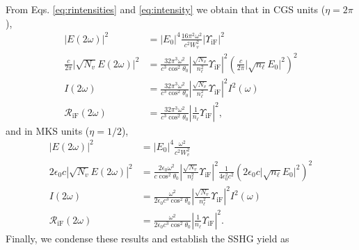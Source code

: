 \documentclass[aps,pra,10pt,amsmath,notitlepage,letterpaper]{revtex4-1}
\begin{document}
From Eqs. \eqref{eq:rintensities} and \eqref{eq:intensity} we obtain that in
CGS units ($\eta=2\pi$), 
\begin{equation}\label{eq:r01}
\begin{split}
\vert E(2\omega)\vert^{2} &=
\vert E_{0}\vert^{4}\frac{16\pi^{2}\omega^{2}}{c^{2}W^2_{v}}
\vert\Upsilon_{\mathrm{iF}}\vert^{2}\\
\frac{c}{2\pi}\vert\sqrt{N_{v}}E(2\omega)\vert^{2} &=
\frac{32\pi^{3}\omega^{2}}{c^{3}\cos^2\theta_{0}}
\left\vert\frac{\sqrt{N_{v}}}{n^{2}_{\ell}}\Upsilon_{\mathrm{iF}}\right\vert^{2} 
\left(\frac{c}{2\pi}\vert\sqrt{n_{\ell}}E_{0}\vert^{2}\right)^{2}\\ 
I(2\omega) &=
\frac{32\pi^{3}\omega^{2}}{c^{3}\cos^2\theta_{0}}
\left\vert\frac{\sqrt{N_{v}}}{n^{2}_{\ell}}\Upsilon_{\mathrm{iF}}\right\vert^{2}
I^{2}(\omega)\\
\mathcal{R}_{\mathrm{iF}}(2\omega) &=
\frac{32\pi^{3}\omega^{2}}{c^{3}\cos^2\theta_{0}}
\left\vert\frac{1}{n_{\ell}}\Upsilon_{\mathrm{iF}}\right\vert^{2},
\end{split} 
\end{equation} 
and in MKS units ($\eta=1/2$),
\begin{equation}\label{r01m}
\begin{split}
\vert E(2\omega)\vert^{2} &=
\vert E_{0}\vert^{4}\frac{\omega^{2}}{c^{2}W^{2}_{v}}\\
2\epsilon_{0}c|\sqrt{N_{v}}E(2\omega)|^{2} &=
\frac{2\epsilon_{0}\omega^{2}}{c\cos^{2}\theta_{0}}
\left\vert\frac{\sqrt{N_{v}}}{n^{2}_{\ell}}\Upsilon_{\mathrm{iF}}\right\vert^{2} 
\frac{1}{4\epsilon^{2}_0c^{2}}
\left(2\epsilon_{0}c\vert\sqrt{n_{\ell}}E_{0}\vert^{2}\right)^{2}\\
I(2\omega) &= 
\frac{\omega^{2}}{2\epsilon_{0}c^3\cos^{2}\theta_{0}}
\left\vert\frac{\sqrt{N_{v}}}{n^{2}_{\ell}}\Upsilon_{\mathrm{iF}}\right\vert^{2}
I^{2}(\omega)\\
\mathcal{R}_{\mathrm{iF}}(2\omega) &=
\frac{\omega^{2}}{2\epsilon_{0}c^3\cos^{2}\theta_{0}}
\left\vert  \frac{1}{n_{\ell}}\Upsilon_{\mathrm{iF}}\right\vert^{2}.
\end{split}
\end{equation}
Finally, we condense these results and establish the SSHG yield as
\end{document}
